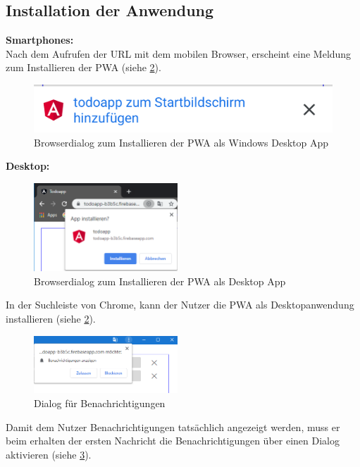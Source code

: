 \subsection{Installation der Anwendung}
\textbf{Smartphones:}\\
Nach dem Aufrufen der URL mit dem mobilen Browser, erscheint eine Meldung zum Installieren der PWA (siehe \ref{fig:dialog_install_pwa_mobile}).

\begin{figure}[h]
	\includegraphics[scale=0.5]{img/pwa_add_to_homescreen.png}
	\centering
	\caption{Browserdialog zum Installieren der PWA als Windows Desktop App}
	\label{fig:dialog_install_pwa_mobile}
\end{figure}

\textbf{Desktop:}
\begin{figure}
	\vspace{-10pt}
	\includegraphics[width=0.48\textwidth]{img/add_to_desktop_2.PNG}
	\caption{Browserdialog zum Installieren der PWA als Desktop App}
	\label{fig:dialog_install_pwa_mobile}
	\vspace{-10pt}
\end{figure}
In der Suchleiste von Chrome, kann der Nutzer die PWA als Desktopanwendung installieren (siehe \ref{fig:dialog_install_pwa_mobile}).
\begin{figure}
	\vspace{-10pt}
	\includegraphics[width=0.48\textwidth]{img/berechtigungen_zulassen.PNG}
	\centering
	\caption{Dialog für Benachrichtigungen}
	\label{fig:pwa_benachrichtigungen_zulassen}
	\vspace{-10pt}
\end{figure}
Damit dem Nutzer Benachrichtigungen tatsächlich angezeigt werden, muss er beim erhalten der ersten Nachricht die Benachrichtigungen über einen Dialog aktivieren (siehe \ref{fig:pwa_benachrichtigungen_zulassen}).

